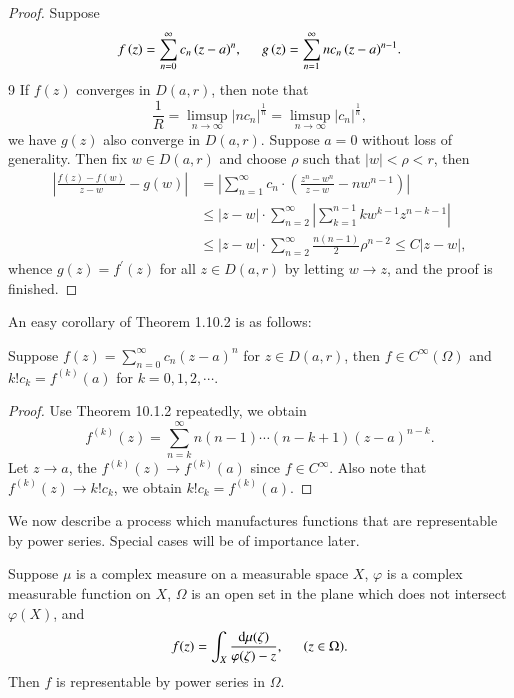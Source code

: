 \begin{proof}
Suppose 
$$
f\left( z \right) =\sum_{n=0}^{\infty}{c_n\left( z-a \right) ^n},\hspace{0.5cm}g\left( z \right) =\sum_{n=1}^{\infty}{nc_n\left( z-a \right) ^{n-1}}.
$$9
If $f(z)$ converges in $D(a,r)$, then note that 
$$
\frac{1}{R}=\mathop {\lim\mathrm{sup}} \limits_{n\rightarrow \infty}\left| nc_n \right|^{\frac{1}{n}}=\mathop {\lim\mathrm{sup}} \limits_{n\rightarrow \infty}\left| c_n \right|^{\frac{1}{n}},
$$
we have $g(z)$ also converge in $D(a,r)$. Suppose $a=0$ without loss of generality. Then fix $w\in D(a,r)$ and choose $\rho$ such that $|w|<\rho<r$, then 
$$
\begin{aligned}
\left| \frac{f\left( z \right) -f\left( w \right)}{z-w}-g\left( w \right) \right|&=\left| \sum_{n=1}^{\infty}{c_n\cdot \left( \frac{z^n-w^n}{z-w}-nw^{n-1} \right)} \right|
\\
&\le \left| z-w \right|\cdot \sum_{n=2}^{\infty}{\left| \sum_{k=1}^{n-1}{kw^{k-1}z^{n-k-1}} \right|}
\\
&\le \left| z-w \right|\cdot \sum_{n=2}^{\infty}{\frac{n\left( n-1 \right)}{2}\rho ^{n-2}}\le C\left| z-w \right|,
\end{aligned}
$$
whence $g(z)=f^\prime(z)$ for all $z\in D(a,r)$ by letting $w\to z$, and the proof is finished.
\end{proof}
An easy corollary of Theorem 1.10.2 is as follows:
\begin{corollary}
Suppose $f(z)=\sum_{n=0}^\infty c_n(z-a)^n$ for $z\in D(a,r)$, then $f\in C^\infty(\Omega)$ and $k!c_k=f^{(k)}(a)$ for $k=0,1,2,\cdots$.
\end{corollary}
\begin{proof}
Use Theorem 10.1.2 repeatedly, we obtain 
$$
f^{\left( k \right)}\left( z \right) =\sum_{n=k}^{\infty}{n\left( n-1 \right) \cdots \left( n-k+1 \right) \left( z-a \right) ^{n-k}}.
$$
Let $z\to a$, the $f^{(k)}(z)\to f^{(k)}(a)$ since $f\in C^\infty$. Also note that $f^{(k)}(z)\to k!c_k$, we obtain $k!c_k=f^{(k)}(a)$.
\end{proof}
We now describe a process which manufactures functions that are representable by power series. Special cases will be of importance later.
\begin{theorem}
Suppose $\mu$ is a complex measure on a measurable space $X$, $\varphi$ is a complex measurable function on $X$, $\Omega$ is an open set in the plane which does not intersect $\varphi(X)$, and 
$$f(z)=\int_X\frac{\mathrm{d}\mu(\zeta)}{\varphi(\zeta)-z},\hspace{0.5cm}(z\in\Omega).$$
Then $f$ is representable by power series in $\Omega$.
\end{theorem}
